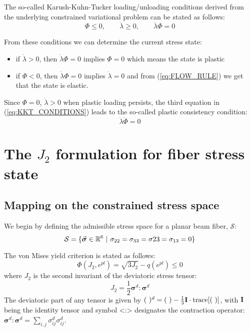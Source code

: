 The so-called Karush-Kuhn-Tucker loading/unloading conditions derived from the 
underlying constrained variational problem\cite{Simo2006} can be stated as
follows:
\begin{equation}
	\Phi\leq 0,\qquad \dot{\lambda} \geq 0,\qquad \dot{\lambda}\Phi=0
	\label{eq:KKT_CONDITIONS}
\end{equation}

From these conditions we can determine the current stress state:
\begin{itemize}
	\item if $\dot{\lambda}>0$, then $\dot{\lambda}\Phi=0$ implies $\Phi=0$ 
	which 
	means 
	the state is plastic
	\item if $\Phi<0$, then $\dot{\lambda}\Phi=0$ implies $\dot{\lambda}=0$ and 
	from 
	(\ref{eq:FLOW_RULE}) we get that the state is elastic.
\end{itemize}
Since $\Phi=0$, $\dot{\lambda}>0$ when plastic loading persists, the third 
equation
in (\ref{eq:KKT_CONDITIONS}) leads to the so-called plastic consistency
condition:
\begin{equation}
	\dot{\lambda}\dot{\Phi}=0
	\label{eq:PLASTIC_CONSISTENCY_CONDITION}
\end{equation}

\section{The \texorpdfstring{$J_2$}{text} formulation for fiber stress 
state}\label{section:CH3-S3}

\subsection{Mapping on the constrained stress space}\label{section:CH3-S3SS1}

We begin by defining the admissible stress space for a planar beam fiber, 
$\mathcal{S}$:
\begin{equation*}
	\mathcal{S} = \{\vec{\boldsymbol{\sigma}}\in\mathbb{R}^6\ |\
	\sigma_{22}=\sigma_{33}=\sigma{23}=\sigma_{13}=0\}
\end{equation*}

\noindent The von Mises yield criterion is stated as follows:
\begin{equation}
	\Phi(J_2,e^{pl}) = \sqrt{3J_2} - q(e^{pl}) \leq 0
	\label{eq:VON_MISES_FUNC}
\end{equation}
where $J_2$
is the second invariant of the deviatoric stress tensor:
\begin{equation}
	J_2 = \frac{1}{2}\bm{\sigma}^d:\bm{\sigma}^d
	\label{eq:J2}
\end{equation}
The deviatoric part of any tensor is given by $(\ )^d=(\ 
)-\frac{1}{3}\bmat{I}\cdot\text{trace}[(\ )]$, with $\mathbf{I}$ being the 
identity tensor and symbol <:> designates the contraction operator: 
$\bm{\sigma}^d:\bm{\sigma}^d = \sum_{i,j}\sigma_{ij}^d\sigma_{ij}^d$.

